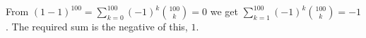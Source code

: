 From $(1-1)^{100}=\sum_{k=0}^{100}(-1)^k\binom{100}k=0$ we get $\sum_{k=1}^{100}(-1)^k\binom{100}k=-1$. The required sum is the negative of this, $\boxed{1}$.
